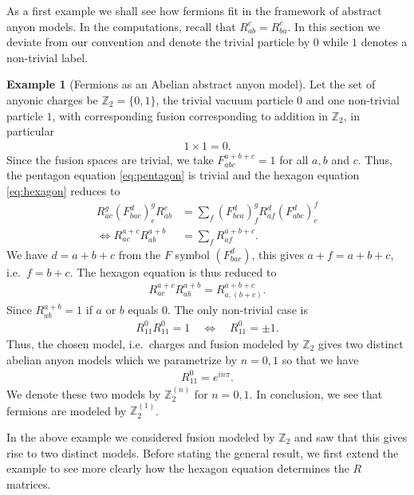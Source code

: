\documentclass[a4paper,10pt,oneside]{book}
\theoremstyle{plain}
\theoremstyle{definition}
\newtheorem{example}{Example}[section]
\theoremstyle{remark}
\begin{document}
As a first example we shall see how fermions fit in the framework of abstract anyon models. In the computations, recall that $R_{ab}^c = R_{ba}^c$. In this section we deviate from our convention and denote the trivial particle by $0$ while $1$ denotes a non-trivial label.

\begin{example}[Fermions as an Abelian abstract anyon model]
  Let the set of anyonic charges be $\mathbb{Z}_2 = \{0, 1\}$, the trivial vacuum particle $0$ and one non-trivial particle $1$, with corresponding fusion corresponding to addition in $\mathbb{Z}_2$, in particular
  \begin{align*}
    1 × 1 = 0.
  \end{align*}
  Since the fusion spaces are trivial, we take $F_{abc}^{a+b+c} = 1$ for all $a, b$ and $c$. Thus, the pentagon equation \cref{eq:pentagon} is trivial and the hexagon equation \cref{eq:hexagon} reduces to
  \begin{align*}
    R_{ac}^g \left(F_{bac}^d\right)^g_e R_{ab}^e &= \sum_{f} \left(F_{bca}^d\right)^g_f R_{af}^d \left(F_{abc}^d\right)^f_e \\
    \iff
    R_{ac}^{a+c} R_{ab}^{a+b} &= \sum_{f} R_{af}^{a+b+c}.
  \end{align*}
  We have $d = a + b + c$ from the $F$ symbol $\left(F_{bac}^d\right)$, this gives $a + f = a + b + c$, i.e.\ $f = b + c$. The hexagon equation is thus reduced to
  \begin{align*}
    R_{ac}^{a+c} R_{ab}^{a+b} = R_{a,(b+c)}^{a+b+c}.
  \end{align*}
  Since $R_{ab}^{a+b} = 1$ if $a$ or $b$ equals $0$. The only non-trivial case is
  \begin{align*}
    R_{11}^{0} R_{11}^{0} = 1 \quad \iff \quad R_{11}^{0} = ±1.
  \end{align*}
  Thus, the chosen model, i.e.\ charges and fusion modeled by $\mathbb{Z}_2$ gives two distinct abelian anyon models which we parametrize by $n = 0, 1$ so that we have
  \begin{align*}
    R_{11}^0 = e^{inπ}.
  \end{align*}
  We denote these two models by $\mathbb{Z}_2^{(n)}$ for $n = 0, 1$. In conclusion, we see that fermions are modeled by $\mathbb{Z}_2^{(1)}$.
\end{example}

In the above example we considered fusion modeled by $\mathbb{Z}_2$ and saw that this gives rise to two distinct models. Before stating the general result, we first extend the example to see more clearly how the hexagon equation determines the $R$ matrices.
\end{document}
